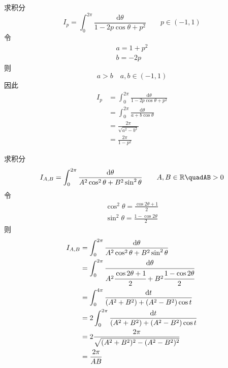 \begin{homeworkProblem}
    求积分
    \[
    I_p = \int_0^{2\pi}\frac{\mathrm{d}\theta}{1-2p\cos\theta+p^2}\qquad p\in(-1,1)
    \]
\solution
令
\begin{gather*}
a=1+p^2\\
b=-2p
\end{gather*}
则\[a>b\quad a,b\in(-1,1)\]
因此
\[\begin{split}
I_p
&= \int_0^{2\pi}\frac{\mathrm{d}\theta}{1-2p\cos\theta+p^2}\\
&= \int_0^{2\pi}\frac{\mathrm{d}\theta}{a+b\cos\theta}\\
&=\frac{2\pi}{\sqrt{a^2-b^2}} \\
&=\frac{2\pi}{1-p^2}
\end{split} \]
\end{homeworkProblem}
\begin{homeworkProblem}
    求积分
    \[
    I_{A,B} = \int_0^{2\pi}\frac{\dtheta}{A^2\cos^2\theta + B^2\sin^2\theta}
    \qquad A,B\in\mathbb{R}\quadAB>0
    \]
\solution
令
\begin{gather*}
\cos^2\theta = \frac{\cos2\theta+1}{2}\\
\sin^2\theta = \frac{1-\cos2\theta}{2}
\end{gather*}
则
\[\begin{split}
I_{A,B} &= \int_0^{2\pi}\frac{\mathrm{d}\theta}{A^2\cos^2\theta + B^2\sin^2\theta}\\
&= \int_0^{2\pi}\cfrac{\mathrm{d}\theta}{A^2\cfrac{\cos2\theta+1}{2} + B^2\cfrac{1-\cos2\theta}{2}} \\
&= \int_0^{4\pi}\frac{\mathrm{d}t}{(A^2+B^2)+(A^2-B^2)\cos t}\\
&= 2\int_0^{2\pi}\frac{\mathrm{d}t}{(A^2+B^2)+(A^2-B^2)\cos t}\\
&=2\frac{2\pi}{\sqrt{(A^2+B^2)^2-(A^2-B^2)^2}}\\
&=\frac{2\pi}{AB}
\end{split}\]
\end{homeworkProblem}

